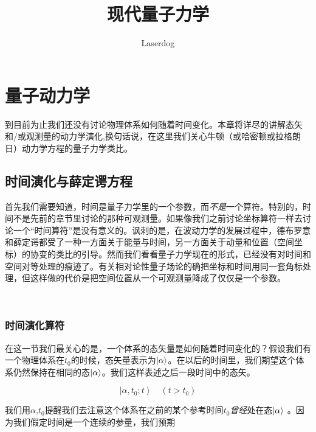 \documentclass[UTF8,twoside]{ctexart}
\begin{document}
\setcounter{section}{1}
\title{现代量子力学}
\author{Laserdog}

\maketitle
\thispagestyle{empty}

\cleardoublepage
{}
\tableofcontents
\clearpage
\section{量子动力学}
\noindent 到目前为止我们还没有讨论物理体系如何随着时间变化。本章将详尽的讲解态矢和/或观测量的动力学演化,换句话说，在这里我们关心牛顿（或哈密顿或拉格朗日）动力学方程的量子力学类比。

\subsection{时间演化与薛定谔方程}



\noindent 首先我们需要知道，时间是量子力学里的一个参数，而{\it 不是}一个算符。特别的，时间不是先前的章节里讨论的那种可观测量。如果像我们之前讨论坐标算符一样去讨论一个“时间算符”是没有意义的。讽刺的是，在波动力学的发展过程中，德布罗意和薛定谔都受了一种一方面关于能量与时间，另一方面关于动量和位置（空间坐标）的协变的类比的引导。然而我们看看量子力学现在的形式，已经没有对时间和空间对等处理的痕迹了。有关相对论性量子场论的确把坐标和时间用同一套角标处理，但这样做的代价是把空间位置从一个可观测量降成了仅仅是一个参数。

\ 

\subsubsection{时间演化算符}


\noindent 在这一节我们最关心的是，一个体系的态矢量是如何随着时间变化的？假设我们有一个物理体系在$t_0$的时候，态矢量表示为$\ket{\alpha}$。在以后的时间里，我们期望这个体系仍然保持在相同的态$\ket{\alpha}$。我们这样表述之后一段时间中的态矢。

\begin{equation}
\left|\alpha, t_0; t\right\rangle\quad(t>t_0)
\end{equation}

\noindent 我们用$\alpha$,$t_0$提醒我们去注意这个体系在之前的某个参考时间$t_0${\it 曾经}处在态$\ket{\alpha}$ 。因为我们假定时间是一个连续的参量，我们预期
\end{document}
